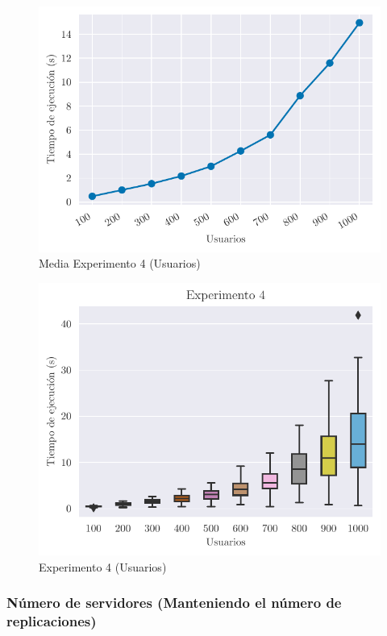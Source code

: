 \begin{figure}[H]
    \centering
    \includegraphics{include/plots/ex4_u_mean_time.pdf}
    \caption{Media Experimento 4 (Usuarios)}%
    \label{fig:ex4u_mean}
\end{figure}

\begin{figure}[H]
    \centering
    \includegraphics{include/plots/ex4_u_time_bplot.pdf}
    \caption{Experimento 4 (Usuarios)}%
    \label{fig:ex4u}
\end{figure}

\subsubsection{Número de servidores (Manteniendo el número de replicaciones)}

